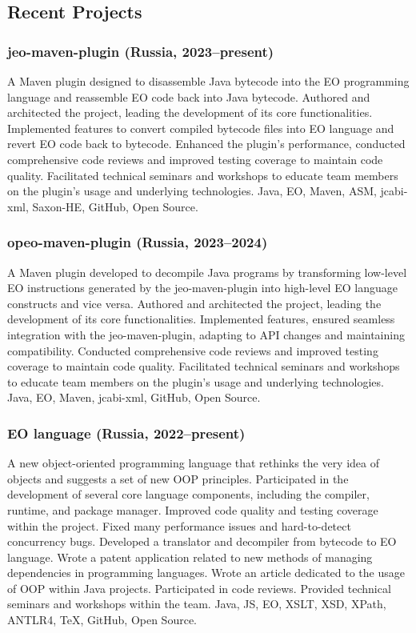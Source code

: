 \documentclass{vl}
\begin{document}
    \subsection*{Recent Projects}

    \subsubsection*{jeo-maven-plugin (Russia, 2023--present)}
    A Maven plugin designed to disassemble Java bytecode into the EO programming language and reassemble EO code back
    into Java bytecode.
    Authored and architected the project, leading the development of its core functionalities.
    Implemented features to convert compiled bytecode files into EO language and revert EO code back to bytecode.
    Enhanced the plugin's performance, conducted comprehensive code reviews and improved testing coverage to maintain
    code quality.
    Facilitated technical seminars and workshops to educate team members on the plugin's usage and underlying
    technologies.
    Java, EO, Maven, ASM, jcabi-xml, Saxon-HE, GitHub, Open Source.

    \subsubsection*{opeo-maven-plugin (Russia, 2023--2024)}
    A Maven plugin developed to decompile Java programs by transforming low-level EO instructions
    generated by the jeo-maven-plugin into high-level EO language constructs and vice versa.
    Authored and architected the project, leading the development of its core functionalities.
    Implemented features, ensured seamless integration with the jeo-maven-plugin, adapting to API changes and
    maintaining compatibility.
    Conducted comprehensive code reviews and improved testing coverage to maintain code quality.
    Facilitated technical seminars and workshops to educate team members on the plugin's usage and underlying
    technologies.
    Java, EO, Maven, jcabi-xml, GitHub, Open Source.

    \subsubsection*{EO language (Russia, 2022--present)}
    A new object-oriented programming language
    that rethinks the very idea of objects and suggests a set of new OOP principles.
    Participated in the development of several core language components,
    including the compiler, runtime, and package manager.
    Improved code quality and testing coverage within the project.
    Fixed many performance issues and hard-to-detect concurrency bugs.
    Developed a translator and decompiler from bytecode to EO language.
    Wrote a patent application related to new methods of managing dependencies in programming languages.
    Wrote an article dedicated to the usage of OOP within Java projects.
    Participated in code reviews.
    Provided technical seminars and workshops within the team.
    Java, JS, EO, XSLT, XSD, XPath, ANTLR4, TeX, GitHub, Open Source.
\end{document}
